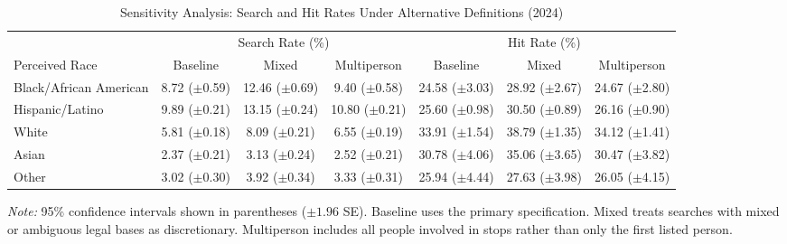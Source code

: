\begin{table}[htbp]
\centering
\caption{Sensitivity Analysis: Search and Hit Rates Under Alternative Definitions (2024)}
\label{tab:sensitivity}
\begin{tabular}{l ccc ccc}
\toprule
 & \multicolumn{3}{c}{Search Rate (\%)} & \multicolumn{3}{c}{Hit Rate (\%)} \\
\cmidrule(lr){2-4} \cmidrule(lr){5-7}
Perceived Race & Baseline & Mixed & Multiperson & Baseline & Mixed & Multiperson \\
\midrule
Black/African American & 8.72 ({\scriptsize $\pm$0.59}) & 12.46 ({\scriptsize $\pm$0.69}) & 9.40 ({\scriptsize $\pm$0.58}) & 24.58 ({\scriptsize $\pm$3.03}) & 28.92 ({\scriptsize $\pm$2.67}) & 24.67 ({\scriptsize $\pm$2.80}) \\
Hispanic/Latino & 9.89 ({\scriptsize $\pm$0.21}) & 13.15 ({\scriptsize $\pm$0.24}) & 10.80 ({\scriptsize $\pm$0.21}) & 25.60 ({\scriptsize $\pm$0.98}) & 30.50 ({\scriptsize $\pm$0.89}) & 26.16 ({\scriptsize $\pm$0.90}) \\
White & 5.81 ({\scriptsize $\pm$0.18}) & 8.09 ({\scriptsize $\pm$0.21}) & 6.55 ({\scriptsize $\pm$0.19}) & 33.91 ({\scriptsize $\pm$1.54}) & 38.79 ({\scriptsize $\pm$1.35}) & 34.12 ({\scriptsize $\pm$1.41}) \\
Asian & 2.37 ({\scriptsize $\pm$0.21}) & 3.13 ({\scriptsize $\pm$0.24}) & 2.52 ({\scriptsize $\pm$0.21}) & 30.78 ({\scriptsize $\pm$4.06}) & 35.06 ({\scriptsize $\pm$3.65}) & 30.47 ({\scriptsize $\pm$3.82}) \\
Other & 3.02 ({\scriptsize $\pm$0.30}) & 3.92 ({\scriptsize $\pm$0.34}) & 3.33 ({\scriptsize $\pm$0.31}) & 25.94 ({\scriptsize $\pm$4.44}) & 27.63 ({\scriptsize $\pm$3.98}) & 26.05 ({\scriptsize $\pm$4.15}) \\
\bottomrule
\end{tabular}
\smallskip
\parbox{\textwidth}{\footnotesize \textit{Note:} 95\% confidence intervals shown in parentheses ($\pm 1.96$ SE). Baseline uses the primary specification. Mixed treats searches with mixed or ambiguous legal bases as discretionary. Multiperson includes all people involved in stops rather than only the first listed person.}
\end{table}
